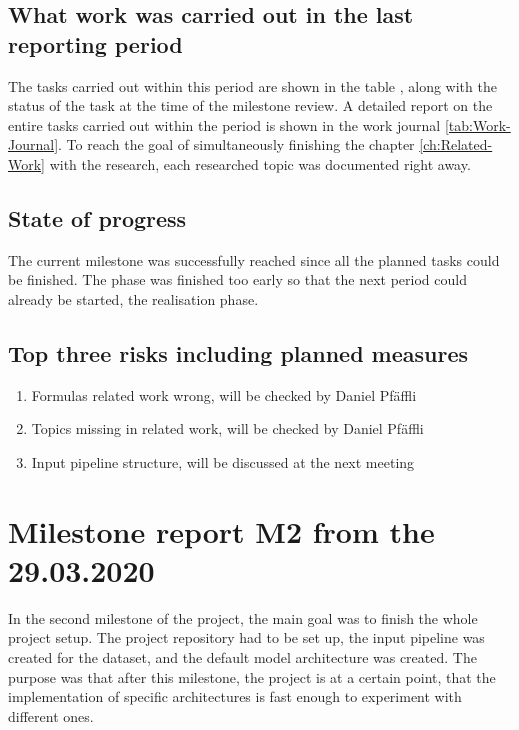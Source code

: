 \subsection{What work was carried out in the last reporting period}
The tasks carried out within this period are shown in the table , along with the status of the task at the time of the milestone review. A detailed report on the entire tasks carried out within the period is shown in the work journal \ref{tab:Work-Journal}. To reach the goal of simultaneously finishing the chapter \ref{ch:Related-Work} with the research, each researched topic was documented right away. 
\subsection{State of progress}
The current milestone was successfully reached since all the planned tasks could be finished. The phase was finished too early so that the next period could already be started, the realisation phase. 

\subsection{Top three risks including planned measures}
\begin{enumerate}
    \setlength\itemsep{0em}
    \item Formulas related work wrong, will be checked by Daniel Pfäffli
    \item Topics missing in related work, will be checked by Daniel Pfäffli
    \item Input pipeline structure, will be discussed at the next meeting
\end{enumerate}

\section{Milestone report M2 from the 29.03.2020}
In the second milestone of the project, the main goal was to finish the whole project setup. The project repository had to be set up, the input pipeline was created for the dataset, and the default model architecture was created. The purpose was that after this milestone, the project is at a certain point, that the implementation of specific architectures is fast enough to experiment with different ones.

